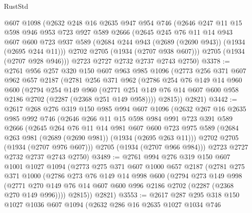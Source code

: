 \begin{lexlean}{RustStd}
\begin{coremodule}
    @607
    @1098
    (@2632
      @248
      @16
      @2635
      @947
      @954
      @746
      (@2646
        @247
        @11
        @15
        @598
        @946
        @953
        @723
        @927
        @589
        @2666
        (@2645
          @245
          @76
          @11
          @14
          @943
          @607
          @600
          @723
          @937
          @589
          (@2684 @244 @943 (@2689 (@2690 @943)) (@1934 (@2695 @244 @11)))
          @2702
          @2705
          (@1934 (@2707 @938 @607)))
        @2705
        (@1934 (@2707 @928 @946)))
      @2723
      @2727
      @2732
      @2737
      @2743
      @2750)
@3378 := @2761
    @956
    @257
    @320
    @150
    @607
    @963
    @985
    @1096
    (@2773
      @256
      @371
      @607
      @962
      @657
      @2187
      (@2781
        @256
        @371
        @962
        (@2786
          @254
          @76
          @149
          @14
          @960
          @600
          (@2794
            @254
            @149
            @960
            (@2771 @251 @149 @76 @14 @607 @600 @958 @2186 @2702 (@2287 (@2368 @251 @149 @958))))
          @2815))
      @2821)
@3442 := @2617
    @268
    @276
    @319
    @150
    @985
    @994
    @607
    @1096
    (@2632
      @267
      @16
      @2635
      @985
      @992
      @746
      (@2646
        @266
        @11
        @15
        @598
        @984
        @991
        @723
        @391
        @589
        @2666
        (@2645
          @264
          @76
          @11
          @14
          @981
          @607
          @600
          @723
          @975
          @589
          (@2684 @263 @981 (@2689 (@2690 @981)) (@1934 (@2695 @263 @11)))
          @2702
          @2705
          (@1934 (@2707 @976 @607)))
        @2705
        (@1934 (@2707 @966 @984)))
      @2723
      @2727
      @2732
      @2737
      @2743
      @2750)
@3489 := @2761
    @994
    @276
    @319
    @150
    @607
    @1001
    @1027
    @1094
    (@2773
      @275
      @371
      @607
      @1000
      @657
      @2187
      (@2781
        @275
        @371
        @1000
        (@2786
          @273
          @76
          @149
          @14
          @998
          @600
          (@2794
            @273
            @149
            @998
            (@2771 @270 @149 @76 @14 @607 @600 @996 @2186 @2702 (@2287 (@2368 @270 @149 @996))))
          @2815))
      @2821)
@3553 := @2617
    @287
    @295
    @318
    @150
    @1027
    @1036
    @607
    @1094
    (@2632
      @286
      @16
      @2635
      @1027
      @1034
      @746

\end{coremodule}
\end{lexlean}
